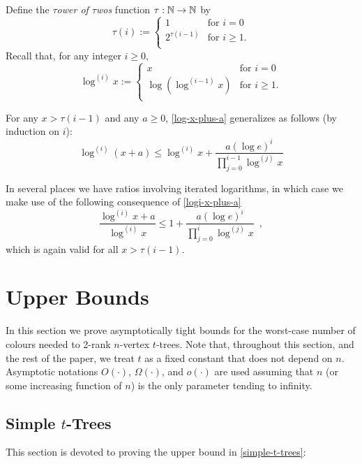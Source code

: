 \documentclass[kpfonts]{patmorin}
\theoremstyle{named}
\begin{document}
Define the \emph{$\tau$ower of $\tau$wos} function $\tau:\mathbb{N}\to\mathbb{N}$ by
\[
  \tau(i) :=
    \begin{cases}
        1 & \text{for $i=0$} \\
        2^{\tau(i-1)} & \text{for $i\ge 1$.} \\
    \end{cases}
\]
Recall that, for any integer $i\ge 0$,
\[
    \log^{(i)} x :=
      \begin{cases}
          x & \text{for $i=0$} \\
          \log\left(\log^{(i-1)}x\right) & \text{for $i\ge 1$.} \\
      \end{cases}
\]

For any $x > \tau(i-1)$ and any $a\ge 0$, \cref{log-x-plus-a} generalizes as follows (by induction on $i$):
\begin{equation}
    \log^{(i)}(x+a) \le \log^{(i)} x + \frac{a(\log e)^i}{\prod_{j=0}^{i-1}\log^{(j)} x} \label{logi-x-plus-a}
\end{equation}

In several places we have ratios involving iterated logarithms, in which case we make use of the following consequence of \cref{logi-x-plus-a}
\begin{equation}
    \frac{\log^{(i)} x+a}{\log^{(i)} x} \le 1 + \frac{a(\log e)^i}{\prod_{j=0}^{i}\log^{(j)} x} \enspace, \label{logi-ratio}
\end{equation}
which is again valid for all $x> \tau(i-1)$.

\section{Upper Bounds}
\label{upper-bounds}

In this section we prove asymptotically tight bounds for the worst-case number of colours needed to 2-rank $n$-vertex $t$-trees.  Note that, throughout this section, and the rest of the paper, we treat $t$ as a fixed constant that does not depend on $n$.  Asymptotic notations $O(\cdot)$, $\Omega(\cdot)$, and $o(\cdot)$ are used assuming that $n$ (or some increasing function of $n$) is the only parameter tending to infinity.

\subsection{Simple $t$-Trees}

This section is devoted to proving the upper bound in \cref{simple-t-trees}:
\end{document}
